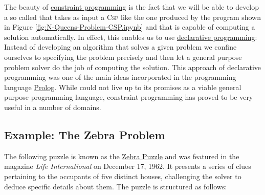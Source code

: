 The beauty of \href{https://en.wikipedia.org/wiki/Constraint_programming}{constraint programming} is the fact
that we will be able to develop a so called  that takes as input a \textsc{Csp}
like the one produced by the program shown in Figure \ref{fig:N-Queens-Problem-CSP.ipynb} and that is capable of
computing a solution automatically.  In effect, this enables us to use
\href{https://en.wikipedia.org/wiki/Declarative_programming}{declarative programming}:  Instead of developing
an algorithm that solves a given problem we confine ourselves to  specifying the problem precisely and then let a
general purpose problem solver do the job of computing the solution.  This approach of declarative programming 
was one of the main ideas incorporated in the programming language
\href{https://en.wikipedia.org/wiki/Prolog}{Prolog}.  While  could not live up to its promises
as a viable general purpose programming language, constraint programming has proved to be very useful in a
number of domains.  

\subsection{Example: The Zebra Problem}
The following puzzle is known as the \href{https://en.wikipedia.org/wiki/Zebra_Puzzle}{Zebra Puzzle} and was featured in the magazine \textit{Life International} on December 17, 1962. It presents a series of clues pertaining to the occupants of five distinct houses, challenging the solver to deduce specific details about them. The puzzle is structured as follows:

